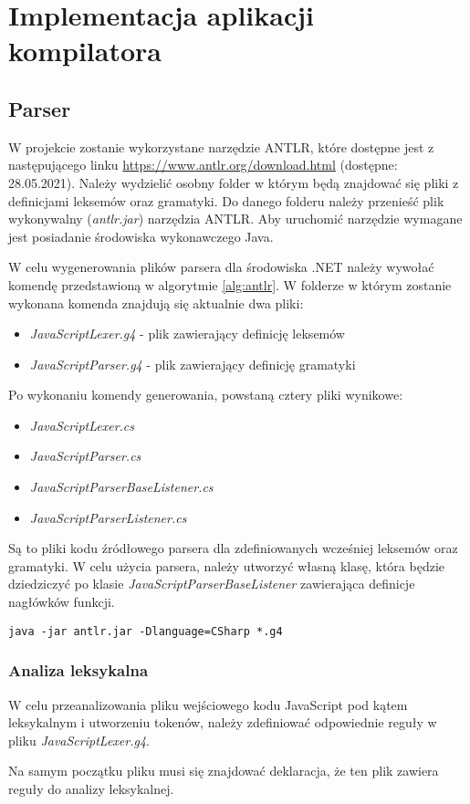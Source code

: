 \chapter{Implementacja aplikacji kompilatora}
\label{rozdzial3}

\section{Parser}
\par W projekcie zostanie wykorzystane narzędzie ANTLR, które dostępne jest z następującego linku \url{https://www.antlr.org/download.html} (dostępne: 28.05.2021). Należy wydzielić osobny folder w którym będą znajdować się pliki z definicjami leksemów oraz gramatyki. Do danego folderu należy przenieść plik wykonywalny (\textit{antlr.jar}) narzędzia ANTLR. Aby uruchomić narzędzie wymagane jest posiadanie środowiska wykonawczego Java.
\par W celu wygenerowania plików parsera dla środowiska .NET należy wywołać komendę przedstawioną w algorytmie \ref{alg:antlr}. W folderze w którym zostanie wykonana komenda znajdują się aktualnie dwa pliki: 
\begin{itemize}
  \item \textit{JavaScriptLexer.g4} - plik zawierający definicję leksemów
  \item \textit{JavaScriptParser.g4} - plik zawierający definicję gramatyki
\end{itemize}
Po wykonaniu komendy generowania, powstaną cztery pliki wynikowe: 
\begin{itemize}
  \item \textit{JavaScriptLexer.cs}
  \item \textit{JavaScriptParser.cs}
  \item \textit{JavaScriptParserBaseListener.cs}
  \item \textit{JavaScriptParserListener.cs}
\end{itemize}
Są to pliki kodu źródłowego parsera dla zdefiniowanych wcześniej leksemów oraz gramatyki. W celu użycia parsera, należy utworzyć własną klasę, która będzie dziedziczyć po klasie \textit{JavaScriptParserBaseListener} zawierająca definicje nagłówków funkcji.

\begin{lstlisting}[caption=Komenda uruchamiająca narzędzie ANTLR, label=alg:antlr]
  java -jar antlr.jar -Dlanguage=CSharp *.g4
\end{lstlisting}

\subsection{Analiza leksykalna}
\par W celu przeanalizowania pliku wejściowego kodu JavaScript pod kątem leksykalnym i utworzeniu tokenów, należy zdefiniować odpowiednie reguły w pliku \textit{JavaScriptLexer.g4}. 
\par Na samym początku pliku musi się znajdować deklaracja, że ten plik zawiera reguły do analizy leksykalnej. 

